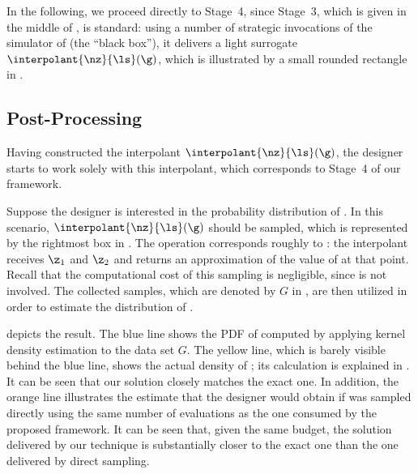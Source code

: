In the following, we proceed directly to Stage~4, since Stage~3, which is given
in the middle of , is standard: using a number of
strategic invocations of the simulator of \g (the ``black box''), it delivers a
light surrogate $\interpolant{\nz}{\ls}(\g)$, which is illustrated by a small
rounded rectangle in .

\subsection{Post-Processing}

Having constructed the interpolant $\interpolant{\nz}{\ls}(\g)$, the designer
starts to work solely with this interpolant, which corresponds to Stage~4 of our
framework.

Suppose the designer is interested in the probability distribution of \g. In
this scenario, $\interpolant{\nz}{\ls}(\g)$ should be sampled, which is
represented by the rightmost box in . The operation
corresponds roughly to : the interpolant receives $\z_1$
and $\z_2$ and returns an approximation of the value of \g at that point. Recall
that the computational cost of this sampling is negligible, since \g is not
involved. The collected samples, which are denoted by $G$ in
, are then utilized in order to estimate the
distribution of \g.

 depicts the result. The blue line shows the \ac{PDF} of \g
computed by applying kernel density estimation \cite{hastie2013} to the data set
$G$. The yellow line, which is barely visible behind the blue line, shows the
actual density of \g; its calculation is explained in . It
can be seen that our solution closely matches the exact one. In addition, the
orange line illustrates the estimate that the designer would obtain if \g was
sampled directly using the same number of evaluations as the one consumed by the
proposed framework. It can be seen that, given the same budget, the solution
delivered by our technique is substantially closer to the exact one than the one
delivered by direct sampling.
